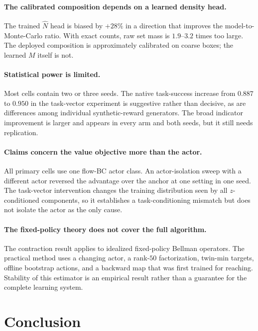 \documentclass{article}
\begin{document}
\paragraph{The calibrated composition depends on a learned density head.}
The trained $\hat N$ head is biased by $+28\%$ in a direction that improves the
model-to-Monte-Carlo ratio. With exact counts, raw set mass is $1.9$--$3.2$ times
too large. The deployed composition is approximately calibrated on coarse boxes;
the learned $M$ itself is not.

\paragraph{Statistical power is limited.}
Most cells contain two or three seeds. The native task-success increase from
$0.887$ to $0.950$ in the task-vector experiment is suggestive rather than
decisive, as are differences among individual synthetic-reward generators. The
broad indicator improvement is larger and appears in every arm and both seeds,
but it still needs replication.

\paragraph{Claims concern the value objective more than the actor.}
All primary cells use one flow-BC actor class. An actor-isolation sweep with a
different actor reversed the advantage over the anchor at one setting in one
seed. The task-vector intervention changes the training distribution seen by all
$z$-conditioned components, so it establishes a task-conditioning mismatch but
does not isolate the actor as the only cause.

\paragraph{The fixed-policy theory does not cover the full algorithm.}
The contraction result applies to idealized fixed-policy Bellman operators. The
practical method uses a changing actor, a rank-$50$ factorization, twin-min
targets, offline bootstrap actions, and a backward map that was first trained for
reaching. Stability of this estimator is an empirical result rather than a
guarantee for the complete learning system.

\section{Conclusion}
\label{sec:conclusion}
\end{document}

